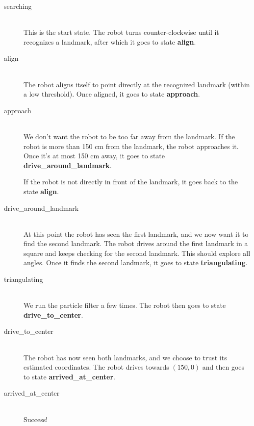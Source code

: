 \documentclass[a4paper,12pt]{article}
\begin{document}
\begin{description}
\item[searching]\hfill\\
This is the start state.  The robot turns counter-clockwise until it recognizes
a landmark, after which it goes to state \textbf{align}.

\item[align]\hfill\\
The robot aligns itself to point directly at the recognized landmark (within
a low threshold).  Once aligned, it goes to state \textbf{approach}.

\item[approach]\hfill\\
We don't want the robot to be too far away from the landmark.  If the robot is
more than 150 cm from the landmark, the robot approaches it.  Once it's at most
150 cm away, it goes to state \textbf{drive_around_landmark}.

If the robot is not directly in front of the landmark, it goes back to the state
\textbf{align}.

\item[drive_around_landmark]\hfill\\
At this point the robot has seen the first landmark, and we now want it to find
the second landmark.  The robot drives around the first landmark in a square and
keeps checking for the second landmark.  This should explore all angles.  Once
it finds the second landmark, it goes to state \textbf{triangulating}.

\item[triangulating]\hfill\\
We run the particle filter a few times.  The robot then goes to state
\textbf{drive_to_center}.

\item[drive_to_center]\hfill\\
The robot has now seen both landmarks, and we choose to trust its estimated
coordinates.  The robot drives towards $(150, 0)$ and then goes to state
\textbf{arrived_at_center}.

\item[arrived_at_center]\hfill\\
Success!
\end{description}
\end{document}
